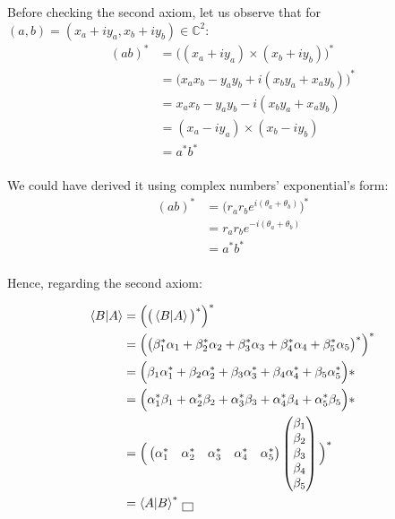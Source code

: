 \documentclass[solutions.tex]{subfiles}
\begin{document}
Before checking the second axiom, let us observe that for
$(a, b) = (x_a+iy_a, x_b+iy_b) \in\mathbb{C}^2$:
\begin{align*}
	(ab)^* &= \Big((x_a+iy_a)\times(x_b+iy_b)\Big)^* \\
	~ &= \Big(x_ax_b - y_ay_b +i(x_by_a +x_ay_b)\Big)^* \\
	~ &= x_ax_b - y_ay_b -i(x_by_a +x_ay_b) \\
	~ &= (x_a-iy_a)\times(x_b-iy_b) \\
	~ &= a^*b^* \\
\end{align*}

\begin{remark} We could have derived it using complex numbers'
exponential's form:
\begin{align*}
	(ab)^* &= \Big(r_ar_be^{i(\theta_a+\theta_b)}\Big)^* \\
	~ &= r_ar_be^{-i(\theta_a+\theta_b)} \\
	~ &= a^*b^* \\
\end{align*}
\end{remark}

Hence, regarding the second axiom:

\begin{align*}
	\left\langle B \middle| A \right\rangle &= \Big(\big(\left\langle B \middle| A \right\rangle\big)^*\Big)^* \\
	~ &= \Big(\big(\beta_1^*\alpha_1 + \beta_2^*\alpha_2 + \beta_3^*\alpha_3 +
	\beta_4^*\alpha_4 + \beta_5^*\alpha_5\big)^*\Big)^* \\
	~ &= \Big(\beta_1\alpha_1^* + \beta_2\alpha_2^* + \beta_3\alpha_3^* +
	\beta_4\alpha_4^* + \beta_5\alpha_5^*\Big)*\\
	~ &= \Big(\alpha_1^*\beta_1 + \alpha_2^*\beta_2 + \alpha_3^*\beta_3 +
	\alpha_4^*\beta_4 + \alpha_5^*\beta_5\Big)*\\
	~ &= \Big(
		\begin{pmatrix}
			\alpha_1^* & \alpha_2^* & \alpha_3^* & \alpha_4^* & \alpha_5^* \\
		\end{pmatrix}
		\begin{pmatrix}
			\beta_1 \\
			\beta_2 \\
			\beta_3 \\
			\beta_4 \\
			\beta_5 \\
		\end{pmatrix} \Big)^*\\
	~ &= \left\langle A \middle| B \right\rangle^* \,\boxed{\,}
\end{align*}
\end{document}
